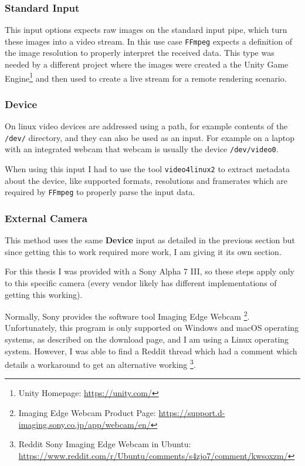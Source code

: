 \subsubsection{Standard Input}

This input options expects raw images on the standard input pipe, which turn these images into a video stream. In this use case \texttt{FFmpeg} expects a definition of the image resolution to properly interpret the received data. This type was needed by a different project where the images were created a the Unity Game Engine\footnote{Unity Homepage: \url{https://unity.com/}} and then used to create a live stream for a remote rendering scenario.

\subsubsection{Device}

On linux video devices are addressed using a path, for example contents of the \texttt{/dev/} directory, and they can also be used as an input. For example on a laptop with an integrated webcam that webcam is usually the device \texttt{/dev/video0}.

When using this input I had to use the tool \texttt{video4linux2} to extract metadata about the device, like supported formats, resolutions and framerates which are required by \texttt{FFmpeg} to properly parse the input data.

\subsubsection{External Camera\label{sec:ext_cam}}

This method uses the same \textbf{Device} input as detailed in the previous section but since getting this to work required more work, I am giving it its own section.

For this thesis I was provided with a Sony Alpha 7 III, so these steps apply only to this specific camera (every vendor likely has different implementations of getting this working).

Normally, Sony provides the software tool Imaging Edge Webcam \footnote{Imaging Edge Webcam Product Page: \url{https://support.d-imaging.sony.co.jp/app/webcam/en/}}. Unfortunately, this program is only supported on Windows and macOS operating systems, as described on the download page, and I am using a Linux operating system. However, I was able to find a Reddit thread which had a comment which details a workaround to get an alternative working \footnote{Reddit Sony Imaging Edge Webcam in Ubuntu: \url{https://www.reddit.com/r/Ubuntu/comments/s4zjo7/comment/kwsoxzm/}}.

